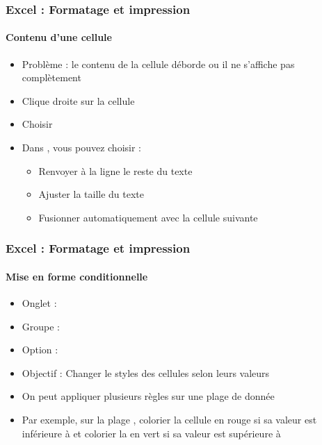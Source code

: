 \documentclass[xcolor=table, usenames,dvipsnames]{beamer}
\begin{document}
\begin{frame}
\frametitle{Excel : Formatage et impression}
\framesubtitle{Contenu d'une cellule}

\begin{minipage}{0.49\textwidth}
	\begin{itemize}
		\item Problème : le contenu de la cellule déborde ou il ne s'affiche pas complètement
		\item Clique droite sur la cellule
		\item Choisir 
	\end{itemize}
\end{minipage}
%
\begin{minipage}{0.5\textwidth} 
	
	
\end{minipage}

\begin{itemize}
	\item Dans , vous pouvez choisir : 
	\begin{itemize}
		\item Renvoyer à la ligne le reste du texte 
		\item Ajuster la taille du texte 
		\item Fusionner automatiquement avec la cellule suivante
	\end{itemize}
\end{itemize}

\end{frame}

\begin{frame}
\frametitle{Excel : Formatage et impression}
\framesubtitle{Mise en forme conditionnelle}

\begin{minipage}{0.69\textwidth}
	\begin{itemize}
		\item Onglet :  
		\item Groupe :  
		\item Option :  
		\item Objectif : Changer le styles des cellules selon leurs valeurs
		\item On peut appliquer plusieurs règles sur une plage de donnée
		\item Par exemple, sur la plage , colorier la cellule en rouge si sa valeur est inférieure à  et colorier la en vert si sa valeur est supérieure à 
	\end{itemize}
\end{minipage}
%
\begin{minipage}{0.3\textwidth} 
	
	
\end{minipage}

\end{frame}
\end{document}
